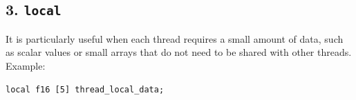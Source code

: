 \subsection*{3. \texttt{local}}

It is particularly useful when each thread requires a small amount of data, such as scalar values or small arrays that do not need to be shared with other threads. Example:

\begin{lstlisting}[language=croqtile,caption={3. local}]
local f16 [5] thread_local_data;
\end{lstlisting}
